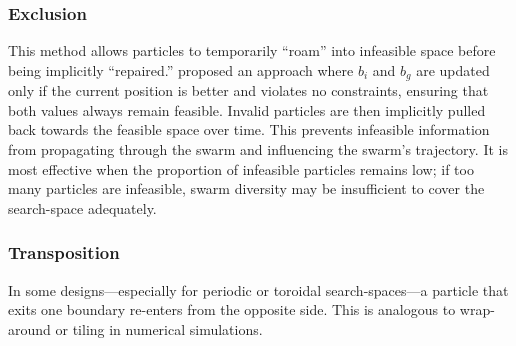 {\subsubsection{Exclusion}
    This method allows particles to temporarily ``roam'' into infeasible space before being implicitly  ``repaired.''  \citet{hu2002solving} proposed an approach where $b_i$ and $b_g$ are updated only if the current position is better and violates no constraints, ensuring that both values always remain feasible.
    Invalid particles are then implicitly pulled back towards the feasible space over time. This prevents infeasible information from propagating through the swarm and influencing the swarm’s trajectory.  
    It 
    is most effective when the proportion of infeasible particles remains low; if too many particles are infeasible, swarm diversity may be insufficient to cover the \gls{search-space} adequately.
\subsubsection{Transposition}
    In some designs---especially for periodic or toroidal \glspl{search-space}---a particle that exits one boundary re-enters from the opposite side. This is analogous to wrap-around or tiling in numerical simulations.
}
